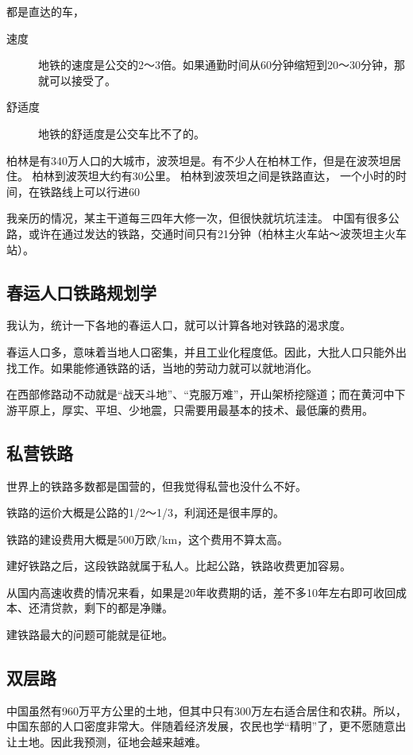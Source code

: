 都是直达的车，

\begin{description}
\item[速度] 地铁的速度是公交的2～3倍。如果通勤时间从60分钟缩短到20～30分钟，那就可以接受了。
\item[舒适度] 地铁的舒适度是公交车比不了的。
\end{description}


柏林是有340万人口的大城市，波茨坦是。有不少人在柏林工作，但是在波茨坦居住。
柏林到波茨坦大约有30公里。
柏林到波茨坦之间是铁路直达，
一个小时的时间，在铁路线上可以行进60

我亲历的情况，某主干道每三四年大修一次，但很快就坑坑洼洼。
中国有很多公路，或许在通过发达的铁路，交通时间只有21分钟（柏林主火车站～波茨坦主火车站）。

\subsection{春运人口铁路规划学}
我认为，统计一下各地的春运人口，就可以计算各地对铁路的渴求度。

春运人口多，意味着当地人口密集，并且工业化程度低。因此，大批人口只能外出找工作。如果能修通铁路的话，当地的劳动力就可以就地消化。

在西部修路动不动就是“战天斗地”、“克服万难”，开山架桥挖隧道；而在黄河中下游平原上，厚实、平坦、少地震，只需要用最基本的技术、最低廉的费用。

\subsection{私营铁路}
世界上的铁路多数都是国营的，但我觉得私营也没什么不好。

铁路的运价大概是公路的1/2～1/3，利润还是很丰厚的。

铁路的建设费用大概是500万欧/km，这个费用不算太高。

建好铁路之后，这段铁路就属于私人。比起公路，铁路收费更加容易。

从国内高速收费的情况来看，如果是20年收费期的话，差不多10年左右即可收回成本、还清贷款，剩下的都是净赚。

建铁路最大的问题可能就是征地。

\subsection{双层路}
中国虽然有960万平方公里的土地，但其中只有300万左右适合居住和农耕。所以，中国东部的人口密度非常大。伴随着经济发展，农民也学“精明”了，更不愿随意出让土地。因此我预测，征地会越来越难。


